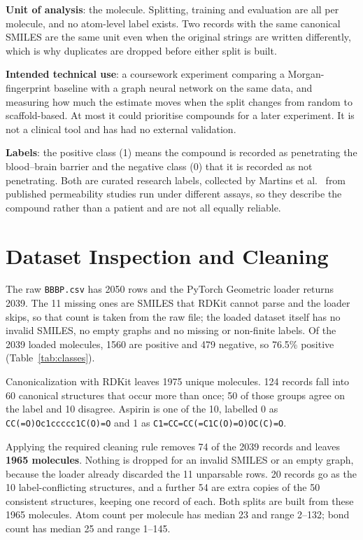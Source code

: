 \documentclass[10pt,a4paper]{article}
\begin{document}
\textbf{Unit of analysis}: the molecule. Splitting, training and evaluation are all per molecule, and no atom-level label exists. Two records with the same canonical SMILES are the same unit even when the original strings are written differently, which is why duplicates are dropped before either split is built.

\textbf{Intended technical use}: a coursework experiment comparing a Morgan-fingerprint baseline with a graph neural network on the same data, and measuring how much the estimate moves when the split changes from random to scaffold-based. At most it could prioritise compounds for a later experiment. It is not a clinical tool and has had no external validation.

\textbf{Labels}: the positive class (1) means the compound is recorded as penetrating the blood--brain barrier and the negative class (0) that it is recorded as not penetrating. Both are curated research labels, collected by Martins et al.~\cite{martins2012} from published permeability studies run under different assays, so they describe the compound rather than a patient and are not all equally reliable.

\section{Dataset Inspection and Cleaning}
The raw \texttt{BBBP.csv} has 2050 rows and the PyTorch Geometric loader returns 2039. The 11 missing ones are SMILES that RDKit cannot parse and the loader skips, so that count is taken from the raw file; the loaded dataset itself has no invalid SMILES, no empty graphs and no missing or non-finite labels. Of the 2039 loaded molecules, 1560 are positive and 479 negative, so 76.5\% positive (Table~\ref{tab:classes}).

Canonicalization with RDKit leaves 1975 unique molecules. 124 records fall into 60 canonical structures that occur more than once; 50 of those groups agree on the label and 10 disagree. Aspirin is one of the 10, labelled 0 as \texttt{CC(=O)Oc1ccccc1C(O)=O} and 1 as \texttt{C1=CC=CC(=C1C(O)=O)OC(C)=O}.

Applying the required cleaning rule removes 74 of the 2039 records and leaves \textbf{1965 molecules}. Nothing is dropped for an invalid SMILES or an empty graph, because the loader already discarded the 11 unparsable rows. 20 records go as the 10 label-conflicting structures, and a further 54 are extra copies of the 50 consistent structures, keeping one record of each. Both splits are built from these 1965 molecules. Atom count per molecule has median 23 and range 2--132; bond count has median 25 and range 1--145.
\end{document}
